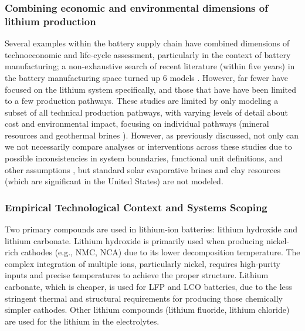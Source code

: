 \subsubsection{Combining economic and environmental dimensions of lithium production}\label{app:04-litreview-tealca}
Several examples within the battery supply chain have combined dimensions of technoeconomic and life-cycle assessment, particularly in the context of battery manufacturing; a non-exhaustive search of recent literature (within five years) in the battery manufacturing space turned up 6 models \cite{daiEverBattClosedloopBattery2019, chenTechnoeconomicAnalysisLithiumion2023, guvenLifecycleAssessmentLifecycle2023, gutschCostsCarbonFootprint2024, maPathwayDecisionsReuse2024, orangiBottomupFrameworkInvestigate2024}. However, far fewer have focused on the lithium system specifically, and those that have have been limited to a few production pathways. These studies are limited by only modeling a subset of all technical production pathways, with varying levels of detail about cost and environmental impact, focusing on individual pathways (mineral resources \cite{gaoLithiumExtractionHard2023, liRecoveryLithiumMineral2019} and geothermal brines \cite{huangLifeCycleAssessment2021}). However, as previously discussed, not only can we not necessarily compare analyses or interventions across these studies due to possible inconsistencies in system boundaries, functional unit definitions, and other assumptions \cite{bergersonLifeCycleAssessment2020}, but standard solar evaporative brines and clay resources (which are significant in the United States) are not modeled.

\subsubsection{Empirical Technological Context and Systems Scoping}\label{app:04-litreview-context}
Two primary compounds are used in lithium-ion batteries: lithium hydroxide and lithium carbonate. Lithium hydroxide is primarily used when producing nickel-rich cathodes (e.g., NMC, NCA) due to its lower decomposition temperature. The complex integration of multiple ions, particularly nickel, requires high-purity inputs and precise temperatures to achieve the proper structure. Lithium carbonate, which is cheaper, is used for LFP and LCO batteries, due to the less stringent thermal and structural requirements for producing those chemically simpler cathodes. Other lithium compounds (lithium fluoride, lithium chloride) are used for the lithium in the electrolytes.

